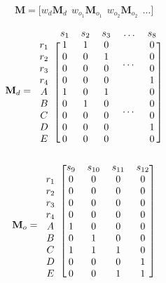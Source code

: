 \begin{equation}\label{eq:horzcat}
\mathbf{M} = \bigg[w_d\mathbf{M}_d ~~ w_{o_1}\mathbf{M}_{o_1} ~~ w_{o_2}\mathbf{M}_{o_2} ~~ \dots\bigg]
\end{equation}

\begin{equation}\label{eq:Md}
\mathbf{M}_d=\begin{blockarray}{cccccc}
                  ~     &  s_1  &  s_2  &  s_3  & \dots &  s_8  \cr
            \begin{block}{c[ccccc]}
                 r_1    &   1   &   1   &   0   &\multirow{4}{*}{\dots} &   0   \cr
                 r_2    &   0   &   0   &   1   &       &   0   \cr
                 r_3    &   0   &   0   &   0   &       &   0   \cr
                 r_4    &   0   &   0   &   0   &       &   1   \cr
                  A     &   1   &   0   &   1   &\multirow{4}{*}{\dots} &   0   \cr
                  B     &   0   &   1   &   0   &       &   0   \cr
                  C     &   0   &   0   &   0   &       &   0   \cr
                  D     &   0   &   0   &   0   &       &   1   \cr
                  E     &   0   &   0   &   0   &       &   0   \cr
            \end{block}
        \end{blockarray}
\end{equation}
\begin{equation}\label{eq:Mo}
\mathbf{M}_o=\begin{blockarray}{ccccc}
            \begin{block}{c[cccc]}
                  ~     &  s_9  & s_{10}& s_{11}& s_{12}\cr
                 r_1    &   0   &   0   &   0   &   0   \cr
                 r_2    &   0   &   0   &   0   &   0   \cr
                 r_3    &   0   &   0   &   0   &   0   \cr
                 r_4    &   0   &   0   &   0   &   0   \cr
                  A     &   1   &   0   &   0   &   0   \cr
                  B     &   0   &   1   &   0   &   0   \cr
                  C     &   1   &   1   &   1   &   0   \cr
                  D     &   0   &   0   &   0   &   1   \cr
                  E     &   0   &   0   &   1   &   1   \cr
            \end{block}
        \end{blockarray}
\end{equation}




